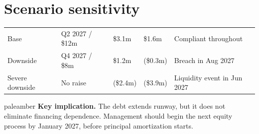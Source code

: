 \section{Scenario sensitivity}

\begin{tabularx}{\textwidth}{@{}L{0.17\textwidth}C{0.16\textwidth}C{0.18\textwidth}C{0.18\textwidth}Y@{}}
\toprule
{}
 &  &  &  &  \\
\midrule
Base & Q2 2027 / \$12m & \$3.1m & \$1.6m & Compliant throughout \\
Downside & Q4 2027 / \$8m & \$1.2m & (\$0.3m) & Breach in Aug 2027 \\
Severe downside & No raise & (\$2.4m) & (\$3.9m) & Liquidity event in Jun 2027 \\
\bottomrule
\end{tabularx}

\begin{callout}{paleamber}
  \textcolor{amber}{\textbf{Key implication.}} The debt extends runway, but it does not eliminate financing dependence. Management should begin the next equity process by January 2027, before principal amortization starts.
\end{callout}

\newpage

